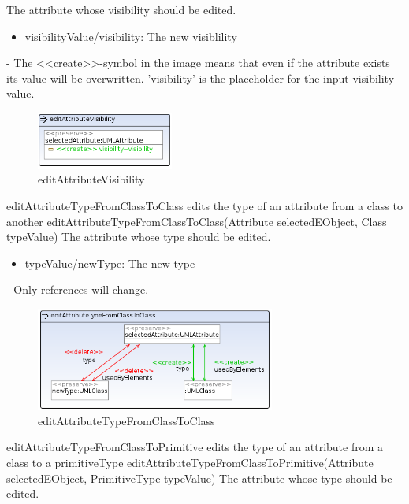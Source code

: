{The attribute whose visibility should be edited.}
{
\begin{itemize}
 \item visibilityValue/visibility: The new visiblility
\end{itemize}
}
{-}
{The \textless\textless create\textgreater\textgreater  -symbol in the image
means that even if the attribute exists its value will be overwritten.
'visibility' is the placeholder for the input visibility value.}
\begin{figure}[H]
  \centering
  \includegraphics[width=0.4\textwidth]{pics/editAttributeVisibility.png}    
  \caption{editAttributeVisibility}
  \label{editAttributeVisibility}  
\end{figure}
\op
{editAttributeTypeFromClassToClass}
{edits the type of an attribute from a class to another}
{editAttributeTypeFromClassToClass(Attribute selectedEObject, Class typeValue)}
{The attribute whose type should be edited.}
{
\begin{itemize}
 \item typeValue/newType: The new type
\end{itemize}
}
{-}
{Only references will change.}
\begin{figure}[H]
  \centering
  \includegraphics[width=0.7\textwidth]{pics/editAttributeTypeFromClassToClass.png}    
  \caption{editAttributeTypeFromClassToClass}
  \label{editAttributeTypeFromClassToClass}  
\end{figure}
\op
{editAttributeTypeFromClassToPrimitive}
{edits the type of an attribute from a class to a primitiveType}
{editAttributeTypeFromClassToPrimitive(Attribute selectedEObject, PrimitiveType typeValue)}
{The attribute whose type should be edited.}
